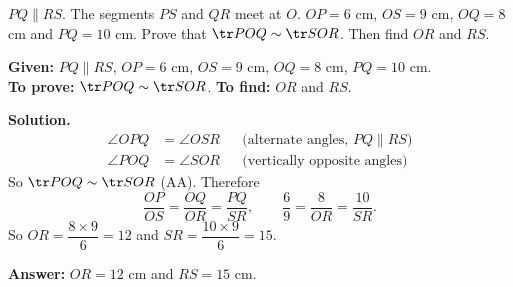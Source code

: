 \begin{example}
$PQ\parallel RS$. The segments $PS$ and $QR$ meet at $O$. $OP=6$ cm, $OS=9$ cm, $OQ=8$ cm and $PQ=10$ cm. Prove that $\tr POQ\sim\tr SOR$. Then find $OR$ and $RS$.

\begin{center}\end{center}

\textbf{Given:} $PQ\parallel RS$, $OP=6$ cm, $OS=9$ cm, $OQ=8$ cm, $PQ=10$ cm.\\
\textbf{To prove:} $\tr POQ\sim\tr SOR$. \textbf{To find:} $OR$ and $RS$.

\textbf{Solution.}
\[
\begin{aligned}
\angle OPQ&=\angle OSR &&\text{(alternate angles, $PQ\parallel RS$)}\\
\angle POQ&=\angle SOR &&\text{(vertically opposite angles)}
\end{aligned}
\]
So $\tr POQ\sim\tr SOR$ (AA). Therefore
\[
\dfrac{OP}{OS}=\dfrac{OQ}{OR}=\dfrac{PQ}{SR},\qquad \dfrac69=\dfrac{8}{OR}=\dfrac{10}{SR}.
\]
So $OR=\dfrac{8\times9}{6}=12$ and $SR=\dfrac{10\times9}{6}=15$.

\textbf{Answer:} $OR=12$ cm and $RS=15$ cm.
\end{example}

